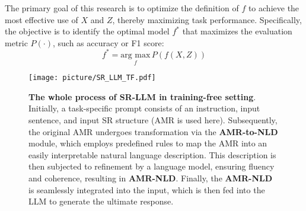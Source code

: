 The primary goal of this research is to optimize the definition of \( f \) to achieve the most effective use of \( X \) and \( Z \), thereby maximizing task performance. Specifically, the objective is to identify the optimal model \( f^* \) that maximizes the evaluation metric \( P(\cdot) \), such as accuracy or F1 score:
    \begin{equation}
f^* = \underset{f}{\text{arg max}} \, P(f(X, Z))
    \end{equation}
\begin{figure*}[t!]
\centering
\vspace{-0.2in}
\texttt{[image: picture/SR\_LLM\_TF.pdf]}
\vspace{-0.3cm}
\caption{\textbf{The whole process of SR-LLM in training-free setting}. Initially, a task-specific prompt consists of an instruction, input sentence, and input SR structure (AMR is used here). Subsequently, the original AMR undergoes transformation via the \textbf{AMR-to-NLD} module, which employs predefined rules to map the AMR into an easily interpretable natural language description. This description is then subjected to refinement by a language model, ensuring fluency and coherence, resulting in \textbf{AMR-NLD}. Finally, the \textbf{AMR-NLD} is seamlessly integrated into the input, which is then fed into the LLM to generate the ultimate response.}

\label{fig:srllmtf}
\vspace{-0.05in}
\end{figure*}








